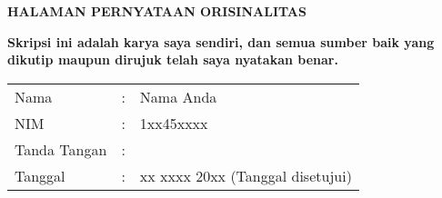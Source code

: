 \cleardoublepage
\centerline{\large\bfseries HALAMAN PERNYATAAN ORISINALITAS}
{}
\vspace*{40pt}
\begin{spacing}{1}
\begin{center}\bf
	Skripsi ini adalah karya saya sendiri, dan semua sumber baik yang dikutip maupun dirujuk telah saya nyatakan benar.
	\vspace*{120pt}
	\begin{spacing}{1.5}
		\begin{tabular}{lcl}
				Nama &:& Nama Anda\\
				NIM &:& 1xx45xxxx\\
				Tanda Tangan &:&\\
				Tanggal &:& xx xxxx 20xx (Tanggal disetujui)
		\end{tabular}
	\end{spacing}
\end{center}
\end{spacing}
